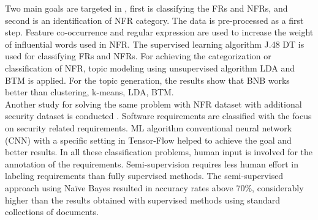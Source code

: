 	Two main goals are targeted in \cite{Abad},
first is classifying the FRs and NFRs, and second is an identification of NFR category. The data is
pre-processed as a first step. Feature co-occurrence and regular expression are used to increase
the weight of influential words used in NFR. The supervised learning algorithm J.48 DT is used
for classifying FRs and NFRs. For achieving the categorization or classification of NFR,
topic modeling using unsupervised algorithm LDA and BTM is applied. For the topic generation, the results show  that BNB works better than clustering, k-means, LDA, BTM. \\


	Another study for solving the same problem with NFR dataset with additional security dataset is conducted \cite{Dekhtyar}.
Software requirements are classified with the focus on security related requirements. ML algorithm
conventional neural network (CNN) with a specific setting in Tensor-Flow helped to achieve the goal and better results. In all
these classification problems, human input is involved for the annotation of the requirements.
Semi-supervision requires less human effort in labeling requirements than fully supervised
methods. The semi-supervised approach \cite{Casamayor} using Naïve Bayes resulted in accuracy rates
above 70\%, considerably higher than the results obtained with supervised methods using
standard collections of documents.
